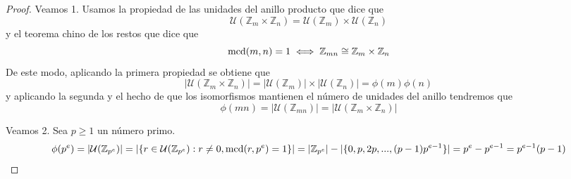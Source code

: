 \begin{proof}
Veamos 1. Usamos la propiedad de las unidades del anillo producto que dice que $$\mathcal U(\mathbb{Z}_m \times \mathbb{Z}_n) = \mathcal U(\mathbb{Z}_m) \times \mathcal U(\mathbb{Z}_n)$$ y el teorema chino de los restos que dice que $$\operatorname*{mcd}(m,n) = 1 \iff \mathbb{Z}_{mn} \cong \mathbb{Z}_m \times \mathbb{Z}_n$$ De este modo, aplicando la primera propiedad se obtiene que $$|\mathcal U(\mathbb{Z}_m \times \mathbb{Z}_n)| = |\mathcal U(\mathbb{Z}_m)| \times |\mathcal U(\mathbb{Z}_n)| = \phi(m) \phi(n)$$ y aplicando la segunda y el hecho de que los isomorfismos mantienen el número de unidades del anillo tendremos que $$\phi(mn) = |\mathcal U(\mathbb{Z}_{mn})| = |\mathcal U(\mathbb{Z}_m \times \mathbb{Z}_n)|$$

Veamos 2. Sea $p \ge 1$ un número primo. $$\phi(p^e) = |\mathcal U(\mathbb{Z}_{p^e})| = |\{r \in \mathcal U(\mathbb{Z}_{p^e}) : r \neq 0, \operatorname*{mcd}(r,p^e) = 1\}| = |\mathbb{Z}_{p^e}|-|\{0,p,2p,...,(p-1)p^{e-1}\}| = p^e - p^{e-1} = p^{e-1}(p-1)$$
\end{proof}
